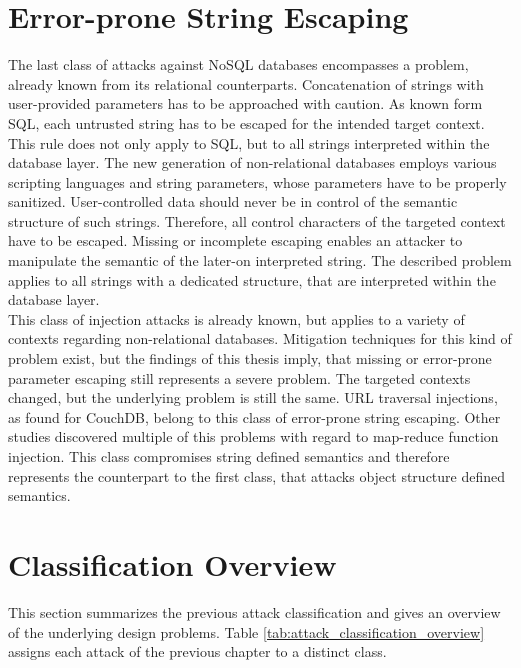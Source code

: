 \section{Error-prone String Escaping}
The last class of attacks against NoSQL databases encompasses a problem, already known from its relational counterparts. Concatenation of strings with user-provided parameters has to be approached with caution. As known form SQL, each untrusted string has to be escaped for the intended target context. This rule does not only apply to SQL, but to all strings interpreted within the database layer. The new generation of non-relational databases employs various scripting languages and string parameters, whose parameters have to be properly sanitized. User-controlled data should never be in control of the semantic structure of such strings. Therefore, all control characters of the targeted context have to be escaped. Missing or incomplete escaping enables an attacker to manipulate the semantic of the later-on interpreted string. The described problem applies to all strings with a dedicated structure, that are interpreted within the database layer. \\

This class of injection attacks is already known, but applies to a variety of contexts regarding non-relational databases. Mitigation techniques for this kind of problem exist, but the findings of this thesis imply, that missing or error-prone parameter escaping still represents a severe problem. The targeted contexts changed, but the underlying problem is still the same. URL traversal injections, as found for CouchDB, belong to this class of error-prone string escaping. Other studies discovered multiple of this problems with regard to map-reduce function injection. This class compromises string defined semantics and therefore represents the counterpart to the first class, that attacks object structure defined semantics.\\

\section{Classification Overview}
This section summarizes the previous attack classification and gives an overview of the underlying design problems. Table \ref{tab:attack_classification_overview} assigns each attack of the previous chapter to a distinct class. \\

